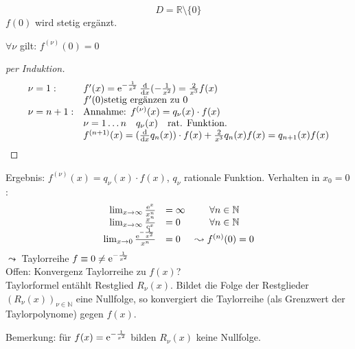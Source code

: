 \begin{equation*}
D=\mathbb{R}\setminus \{0\}
\end{equation*}
$f(0)$ wird stetig ergänzt.
\begin{proposition}
  $\forall \nu$ gilt: $f^{(\nu)}(0) = 0$
\end{proposition}

\begin{proof}[per Induktion]\flush
   \begin{align*}
      \begin{array}{ll}
         \nu = 1: & f'(x) = \operatorname{e}^{-\frac{1}{x^2}}\frac{\mathrm d}{\mathrm dx}(-\frac{1}{x^2}) = \frac{2}{x^3}f(x) \\
         & f'(0) \text{stetig ergänzen zu 0} \\
         \nu = n+1: & \text{Annahme: } f^{(\nu)}(x) = q_\nu(x)\cdot f(x) \\
         & \nu=1\ldots n \quad q_\nu(x) \quad \text{rat. Funktion.}\\
         & f^{(n+1)}(x) = (\frac{\mathrm d}{\mathrm dx} q_n(x))\cdot f(x) + \frac{2}{x^3} q_n(x) f(x)= q_{n+1}(x)f(x)
      \end{array}
   \end{align*}
\end{proof}
Ergebnis: $f^{(\nu)}(x) = q_\nu(x)\cdot f(x)$, $q_\nu$ rationale Funktion.
Verhalten in $x_0 = 0$:
\begin{align*}
\begin{array}{rlc}
   \lim_{x\rightarrow \infty} \frac{\operatorname{e}^x}{x^n} & = \infty & \forall n \in \mathbb{N}\\
   \lim_{x\rightarrow \infty} \frac{x^n}{\operatorname{e}^x} & = 0 & \forall n \in \mathbb{N}\\
   \lim_{x\rightarrow 0} \frac{\operatorname{e}^{-\frac{1}{x^2}}}{x^n} & = 0 & \leadsto f^{(n)}(0) = 0
   \end{array}
\end{align*}
$\leadsto$ Taylorreihe $f \equiv 0 \neq \operatorname{e}^{-\frac{1}{x^2}}$\\
Offen: Konvergenz Taylorreihe zu $f(x)$?\\
Taylorformel entählt Restglied $R_\nu(x)$. Bildet die Folge der Restglieder $(R_\nu(x))_{\nu \in \mathbb{N}}$ eine Nullfolge, so konvergiert die Taylorreihe (als Grenzwert der Taylorpolynome) gegen $f(x)$.

Bemerkung: für $f(x) = \operatorname{e}^{-\frac{1}{x^2}}$ bilden $R_\nu(x)$ keine Nullfolge.

%
%
